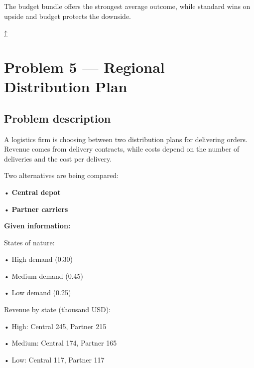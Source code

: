 \documentclass[11pt]{article}
\begin{document}
	
	
	The budget bundle offers the strongest average outcome, while standard wins on upside and budget protects the downside.
	
	
	
	\hyperref[problem4-criteria]{↑}
	\section*{Problem 5 — Regional Distribution Plan}
	
	\label{problem5}
	
	\subsection*{Problem description}
	
	\label{problem5-problem}
	
	A logistics firm is choosing between two distribution plans for delivering orders. Revenue comes from delivery contracts,
	while costs depend on the number of deliveries and the cost per delivery.
	
	
	
	
	
	
	Two alternatives are being compared:
	
	
	
	• \textbf{Central depot}
	
	
	
	• \textbf{Partner carriers}
	
	
	
	
	
	\textbf{Given information:}
	
	
	
	States of nature:
	
	
	
	• High demand (0.30)
	
	
	
	• Medium demand (0.45)
	
	
	
	• Low demand (0.25)
	
	
	
	
	
	Revenue by state (thousand USD):
	
	
	
	• High: Central 245, Partner 215
	
	
	
	• Medium: Central 174, Partner 165
	
	
	
	• Low: Central 117, Partner 117
	
\end{document}
